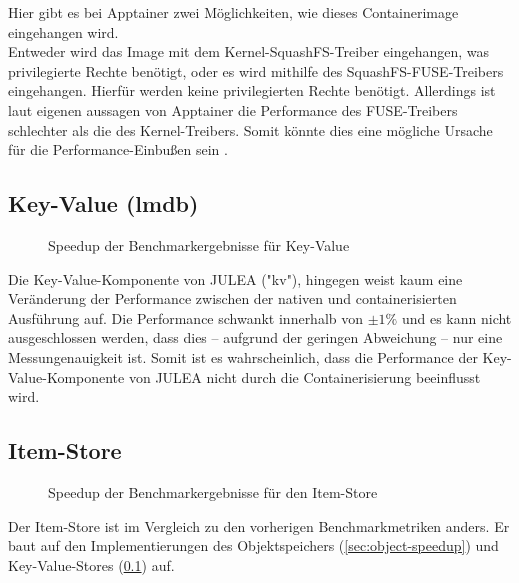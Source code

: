 Hier gibt es bei Apptainer zwei Möglichkeiten, wie dieses Containerimage eingehangen wird. \\
Entweder wird das Image mit dem Kernel-SquashFS-Treiber eingehangen, was privilegierte Rechte benötigt, oder es wird mithilfe des SquashFS-FUSE-Treibers eingehangen. Hierfür werden keine privilegierten Rechte benötigt. Allerdings ist laut eigenen aussagen von Apptainer die Performance des FUSE-Treibers schlechter als die des Kernel-Treibers. Somit könnte dies eine mögliche Ursache für die Performance-Einbußen sein \cite{apptainerSecurityApptainerApptainer}.  

\subsection{Key-Value (lmdb)} \label{sec:kv-speedup}

\begin{figure}[H]
    \centering
    
    \caption{Speedup der Benchmarkergebnisse für Key-Value}
    \label{fig:speedup_kv}
\end{figure}

\FloatBarrier

Die Key-Value-Komponente von JULEA ("kv"), hingegen weist kaum eine Veränderung der Performance zwischen der nativen und containerisierten Ausführung auf. Die Performance schwankt innerhalb von $\pm 1\%$ und es kann nicht ausgeschlossen werden, dass dies – aufgrund der geringen Abweichung – nur eine Messungenauigkeit ist. Somit ist es wahrscheinlich, dass die Performance der Key-Value-Komponente von JULEA nicht durch die Containerisierung beeinflusst wird.

\subsection{Item-Store}

\begin{figure}[H]
    \centering
    
    \caption{Speedup der Benchmarkergebnisse für den Item-Store}
    \label{fig:speedup_item}
\end{figure}

\FloatBarrier

Der Item-Store ist im Vergleich zu den vorherigen Benchmarkmetriken anders. Er baut auf den Implementierungen des Objektspeichers (\cref{sec:object-speedup}) und Key-Value-Stores (\cref{sec:kv-speedup}) auf.

